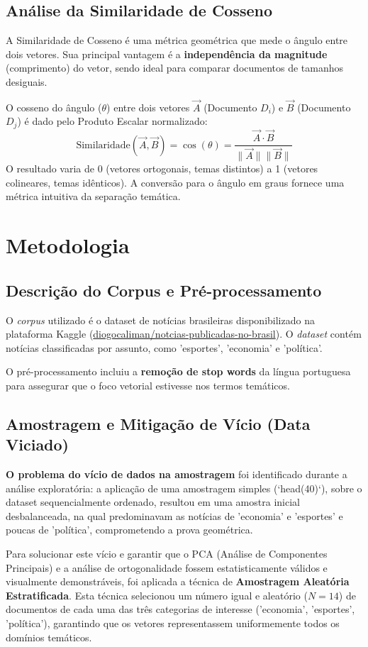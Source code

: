 \documentclass[a4paper, 12pt]{article}
\begin{document}
\subsection{Análise da Similaridade de Cosseno}

A Similaridade de Cosseno é uma métrica geométrica que mede o ângulo entre dois vetores. Sua principal vantagem é a \textbf{independência da magnitude} (comprimento) do vetor, sendo ideal para comparar documentos de tamanhos desiguais.

O cosseno do ângulo ($\theta$) entre dois vetores $\vec{A}$ (Documento $D_i$) e $\vec{B}$ (Documento $D_j$) é dado pelo Produto Escalar normalizado:
$$
\text{Similaridade}(\vec{A}, \vec{B}) = \cos(\theta) = \frac{\vec{A} \cdot \vec{B}}{\|\vec{A}\| \|\vec{B}\|}
$$
O resultado varia de 0 (vetores ortogonais, temas distintos) a 1 (vetores colineares, temas idênticos). A conversão para o ângulo em graus fornece uma métrica intuitiva da separação temática.

\section{Metodologia}

\subsection{Descrição do Corpus e Pré-processamento}
O \textit{corpus} utilizado é o dataset de notícias brasileiras disponibilizado na plataforma Kaggle (\url{diogocaliman/notcias-publicadas-no-brasil}). O \textit{dataset} contém notícias classificadas por assunto, como 'esportes', 'economia' e 'política'.

O pré-processamento incluiu a \textbf{remoção de stop words} da língua portuguesa para assegurar que o foco vetorial estivesse nos termos temáticos.

\subsection{Amostragem e Mitigação de Vício (Data Viciado)}
\textbf{O problema do vício de dados na amostragem} foi identificado durante a análise exploratória: a aplicação de uma amostragem simples (`head(40)`), sobre o dataset sequencialmente ordenado, resultou em uma amostra inicial desbalanceada, na qual predominavam as notícias de 'economia' e 'esportes' e poucas de 'política', comprometendo a prova geométrica.

Para solucionar este vício e garantir que o PCA (Análise de Componentes Principais) e a análise de ortogonalidade fossem estatisticamente válidos e visualmente demonstráveis, foi aplicada a técnica de \textbf{Amostragem Aleatória Estratificada}. Esta técnica selecionou um número igual e aleatório ($N=14$) de documentos de cada uma das três categorias de interesse ('economia', 'esportes', 'política'), garantindo que os vetores representassem uniformemente todos os domínios temáticos.
\end{document}
